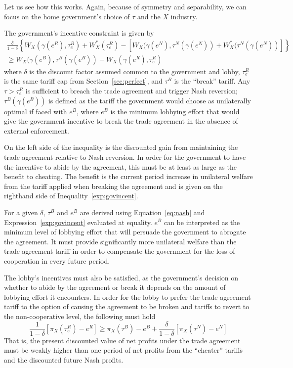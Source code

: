 \documentclass[12pt]{article}
\newcommand{\ga}{\gamma}
\newcommand{\de}{\delta}
\begin{document}
Let us see how this works. Again, because of symmetry and separability, we can focus on the home government's choice of $\tau$ and the $X$ industry.

The government's incentive constraint is given by
  \begin{multline}
    \frac{\de}{1-\de} \left\{W_X(\ga(e^R),\tau_e^R) + W_X^*(\tau_e^R) - \left[W_X(\ga(e^N),\tau^N(\ga(e^N)) + W_X^*(\tau^N(\ga(e^N)) \right] \right\} \\ \geq W_X(\ga(e^B),\tau^B(\ga(e^B)) - W_X(\ga(e^R),\tau_e^R)
		\label{exp:govincent}
  \end{multline}
where $\de$ is the discount factor assumed common to the government and lobby, $\tau_e^R$ is the same tariff cap from Section~\ref{sec:perfect}, and $\tau^B$ is the ``break'' tariff. Any $\tau > \tau_e^R$ is sufficient to breach the trade agreement and trigger Nash reversion; $\tau^B(\ga(e^B))$ is defined as the tariff the government would choose as unilaterally optimal if faced with $e^B$, where $e^B$ is the minimum lobbying effort that would give the government incentive to break the trade agreement in the absence of external enforcement.

On the left side of the inequality is the discounted gain from maintaining the trade agreement relative to Nash reversion. In order for the government to have the incentive to abide by the agreement, this must be at least as large as the benefit to cheating. The benefit is the current period increase in unilateral welfare from the tariff applied when breaking the agreement and is given on the righthand side of Inequality~\ref{exp:govincent}.

For a given $\de$, $\tau^B$ and $e^B$ are derived using Equation~\ref{eq:nash} and Expression~\ref{exp:govincent} evaluated at equality. $e^B$ can be interpreted as the minimum level of lobbying effort that will persuade the government to abrogate the agreement. It must provide significantly more unilateral welfare than the trade agreement tariff in order to compensate the government for the loss of cooperation in every future period.

The lobby's incentives must also be satisfied, as the government's decision on whether to abide by the agreement or break it depends on the amount of lobbying effort it encounters. In order for the lobby to prefer the trade agreement tariff to the option of causing the agreement to be broken and tariffs to revert to the non-cooperative level, the following must hold
\begin{equation}
  \frac{1}{1-\de}\left[\pi_X(\tau_e^R) - e^R\right] \geq \pi_X(\tau^B) - e^B + \frac{\de}{1-\de}\left[\pi_X(\tau^N) - e^N\right]
	\label{exp:lobby}
\end{equation}
That is, the present discounted value of net profits under the trade agreement must be weakly higher than one period of net profits from the ``cheater'' tariffs and the discounted future Nash profits.
\end{document}
